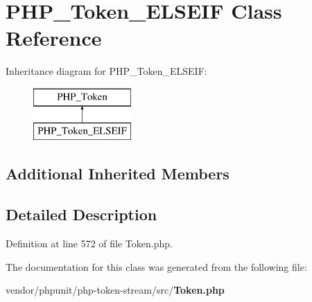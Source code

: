 \section{P\+H\+P\+\_\+\+Token\+\_\+\+E\+L\+S\+E\+I\+F Class Reference}
\label{class_p_h_p___token___e_l_s_e_i_f}
Inheritance diagram for P\+H\+P\+\_\+\+Token\+\_\+\+E\+L\+S\+E\+I\+F\+:\begin{figure}[H]
\begin{center}
\leavevmode
\includegraphics[height=2.000000cm]{class_p_h_p___token___e_l_s_e_i_f}
\end{center}
\end{figure}
\subsection*{Additional Inherited Members}


\subsection{Detailed Description}


Definition at line 572 of file Token.\+php.



The documentation for this class was generated from the following file\+:\begin{DoxyCompactItemize}
\item 
vendor/phpunit/php-\/token-\/stream/src/{\bf Token.\+php}\end{DoxyCompactItemize}
